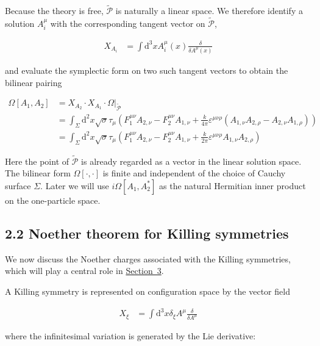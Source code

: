 Because the theory is free, $\widetilde{\mathcal{P}}$ is naturally a linear space. We therefore identify a solution $A_i^\mu$ with the corresponding tangent vector on $\widetilde{\mathcal{P}}$,

\begin{align}
X_{A_{i}} & =\int \mathrm{d}^{3}xA_{i}^{\mu}(x) \frac{\delta}{\delta A^{\mu}(x)}
\end{align}

and evaluate the symplectic form on two such tangent vectors to obtain the bilinear pairing

\begin{align}
\Omega[A_{1},A_{2}] & =X_{A_{2}}\cdot X_{A_{1}}\cdot \Omega|_{\widetilde{\mathcal{P}}} \\
 & =\int _{\Sigma}\mathrm{d}^{2}x\sqrt{ \sigma }\tau _{\mu}\left(F_{1}^{\mu \nu}A_{2,\nu}-F_{2}^{\mu \nu}A_{1,\nu}+\frac{k}{4\pi}\varepsilon ^{\mu \nu \rho}(A_{1,\nu}A_{2,\rho}-A_{2,\nu}A_{1,\rho})\right) \\
 & =\int _{\Sigma}\mathrm{d}^{2}x\sqrt{ \sigma }\tau _{\mu}\left(F_{1}^{\mu \nu}A_{2,\nu}-F_{2}^{\mu \nu}A_{1,\nu}+\frac{k}{2\pi}\varepsilon ^{\mu \nu \rho}A_{1,\nu}A_{2,\rho}\right)
\end{align}

Here the point of $\widetilde{\mathcal{P}}$ is already regarded as a vector in the linear solution space. The bilinear form $\Omega[\cdot,\cdot]$ is finite and independent of the choice of Cauchy surface $\Sigma$. Later we will use $i\Omega[A_1,A^{*}_2]$ as the natural Hermitian inner product on the one-particle space.

\subsection{2.2 Noether theorem for Killing symmetries}\label{subsec:noether-killing-symmetries}

We now discuss the Noether charges associated with the Killing symmetries, which will play a central role in \hyperref[sec:quantization]{Section~3}.

A Killing symmetry is represented on configuration space by the vector field

\begin{align}
X_{\xi} & =\int \mathrm{d}^{3}x\delta _{\xi}A^{\mu} \frac{\delta}{\delta A^{\mu}}
\end{align}

where the infinitesimal variation is generated by the Lie derivative:

